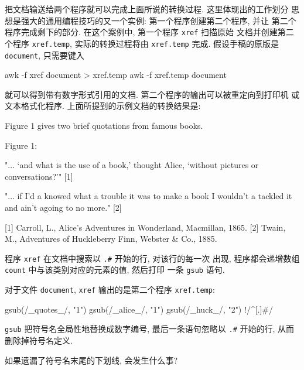 把文档输送给两个程序就可以完成上面所说的转换过程. 这里体现出的工作划分
思想是强大的通用编程技巧的又一个实例: 第一个程序创建第二个程序, 并让
第二个程序完成剩下的部分. 在这个案例中, 第一个程序 \texttt{xref} 扫描原始
文档并创建第二个程序 \texttt{xref.temp}, 实际的转换过程将由
\texttt{xref.temp} 完成. 假设手稿的原版是 \texttt{document}, 只需要键入
\begin{awkcode}
    awk -f xref document > xref.temp
    awk -f xref.temp document
\end{awkcode}
就可以得到带有数字形式引用的文档. 第二个程序的输出可以被重定向到打印机
或文本格式化程序.
上面所提到的示例文档的转换结果是:
\begin{awkcode}
    Figure 1 gives two brief quotations from famous books.

                            Figure 1:

      "... `and what is the use of a book,' thought Alice,
      `without pictures or conversations?'" [1]

      "... if I'd a knowed what a trouble it was to make a book
      I wouldn't a tackled it and ain't agoing to no more." [2]


    [1] Carroll, L., Alice's Adventures in Wonderland,
        Macmillan, 1865.
    [2] Twain, M., Adventures of Huckleberry Finn,
        Webster & Co., 1885.
\end{awkcode}

程序 \texttt{xref} 在文档中搜索以 \texttt{.\#} 开始的行, 对该行的每一次
出现, 程序都会递增数组 \texttt{count} 中与该类别对应的元素的值, 然后打印
一条 \texttt{gsub} 语句.
对于文件 \texttt{document}, \texttt{xref} 输出的是第二个程序
\texttt{xref.temp}:
\begin{awkcode}
    { gsub(/_quotes_/, "1") }
    { gsub(/_alice_/, "1") }
    { gsub(/_huck_/, "2") }
    !/^[.]#/
\end{awkcode}
\texttt{gsub} 把符号名全局性地替换成数字编号, 最后一条语句忽略以 \texttt{.\#}
开始的行, 从而删除掉符号名定义.

\begin{exercise}
    \label{exer:lack_underscore}
    如果遗漏了符号名末尾的下划线, 会发生什么事?
\end{exercise}

